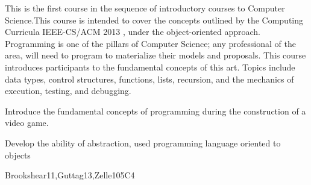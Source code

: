 \begin{syllabus}


\begin{justification}
This is the first course in the sequence of introductory courses to Computer Science.This course is intended to cover the concepts outlined by the
Computing Curricula IEEE-CS/ACM 2013 , under the object-oriented approach.
Programming is one of the pillars of Computer Science; any professional of the area, will need to program to materialize their models and proposals.
This course introduces participants to the fundamental concepts of this art.
Topics include data types, control structures, functions, lists, recursion, and the mechanics of execution, testing, and debugging.
\end{justification}

\begin{goals}
\item Introduce the fundamental concepts of programming during the construction of a video game.
\item Develop the ability of abstraction, used programming language oriented to objects
\end{goals}

\begin{outcomes}
    \item {}
    \item {}
\end{outcomes}

\begin{competences}
    \item {} 
    \item {} 
\end{competences}

\begin{unit}{\SPHistory}{}{Brookshear11,Guttag13,Zelle10}{5}{C4}
    \begin{topics}
        \item \SPHistoryTopicPrehistory
        \item \SPHistoryTopicHistory
        \item \SPHistoryTopicPioneers
        \item \SPHistoryTopicHistoryOf
    \end{topics}
    
    \begin{learningoutcomes}
        \item \SPHistoryLOIdentifySignificant [\Familiarity]
        \item \SPHistoryLOIdentifyTheSeveral [\Familiarity]
        \item \SPHistoryLODiscussTheForLanguage [\Familiarity]
        \item \SPHistoryLOCompareDaily [\Assessment] 
    \end{learningoutcomes}
\end{unit}


\end{syllabus}
